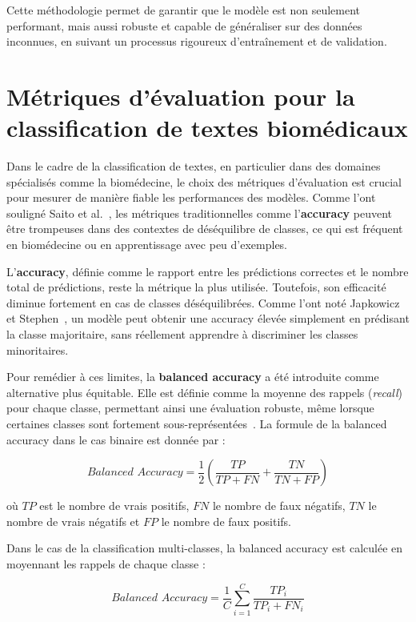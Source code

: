 \documentclass[12pt]{report}
\begin{document}
Cette méthodologie permet de garantir que le modèle est non seulement performant, mais aussi robuste et capable de généraliser sur des données inconnues, en suivant un processus rigoureux d'entraînement et de validation.

\section{Métriques d’évaluation pour la classification de textes biomédicaux}

Dans le cadre de la classification de textes, en particulier dans des domaines spécialisés comme la biomédecine, le choix des métriques d’évaluation est crucial pour mesurer de manière fiable les performances des modèles. Comme l’ont souligné Saito et al.~\cite{saito2015precision}, les métriques traditionnelles comme l’\textbf{accuracy} peuvent être trompeuses dans des contextes de déséquilibre de classes, ce qui est fréquent en biomédecine ou en apprentissage avec peu d’exemples.

L’\textbf{accuracy}, définie comme le rapport entre les prédictions correctes et le nombre total de prédictions, reste la métrique la plus utilisée. Toutefois, son efficacité diminue fortement en cas de classes déséquilibrées. Comme l’ont noté Japkowicz et Stephen~\cite{japkowicz2002class}, un modèle peut obtenir une accuracy élevée simplement en prédisant la classe majoritaire, sans réellement apprendre à discriminer les classes minoritaires.

Pour remédier à ces limites, la \textbf{balanced accuracy} a été introduite comme alternative plus équitable. Elle est définie comme la moyenne des rappels (\textit{recall}) pour chaque classe, permettant ainsi une évaluation robuste, même lorsque certaines classes sont fortement sous-représentées~\cite{brodersen2010balanced}. La formule de la balanced accuracy dans le cas binaire est donnée par :

\[
\textit{Balanced Accuracy} = \frac{1}{2} \left( \frac{TP}{TP + FN} + \frac{TN}{TN + FP} \right)
\]

où \( TP \) est le nombre de vrais positifs, \( FN \) le nombre de faux négatifs, \( TN \) le nombre de vrais négatifs et \( FP \) le nombre de faux positifs.

Dans le cas de la classification multi-classes, la balanced accuracy est calculée en moyennant les rappels de chaque classe :

\[
\textit{Balanced Accuracy} = \frac{1}{C} \sum_{i=1}^{C} \frac{TP_i}{TP_i + FN_i}
\]
\end{document}
